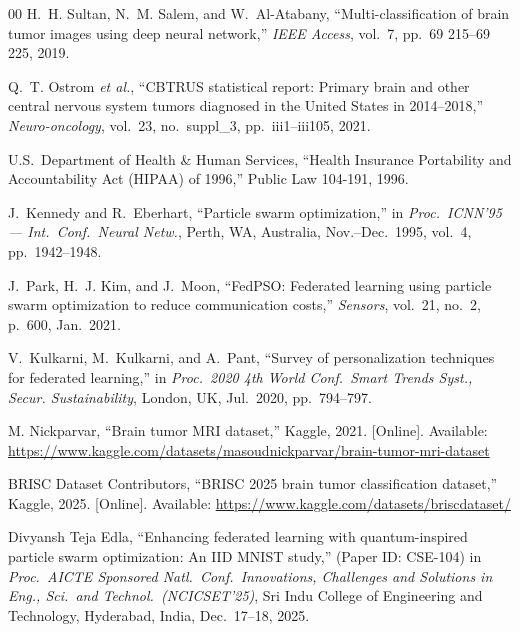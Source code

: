 \documentclass[conference]{IEEEtran}
\begin{document}
\begin{thebibliography}{00}
H.~H. Sultan, N.~M. Salem, and W.~Al-Atabany,
``Multi-classification of brain tumor images using deep neural network,''
\textit{IEEE Access}, vol.~7, pp.~69 215--69 225, 2019.

Q.~T. Ostrom \textit{et al.},
``CBTRUS statistical report: Primary brain and other central nervous system
tumors diagnosed in the United States in 2014--2018,''
\textit{Neuro-oncology}, vol.~23, no.~suppl\_3, pp.~iii1--iii105, 2021.

U.S.\ Department of Health \& Human Services,
``Health Insurance Portability and Accountability Act (HIPAA) of 1996,''
Public Law 104-191, 1996.

J.~Kennedy and R.~Eberhart,
``Particle swarm optimization,''
in \textit{Proc.\ ICNN'95 --- Int.\ Conf.\ Neural Netw.}, Perth, WA, Australia,
Nov.--Dec.\ 1995, vol.~4, pp.~1942--1948.

J.~Park, H.~J. Kim, and J.~Moon,
``FedPSO: Federated learning using particle swarm optimization to
reduce communication costs,''
\textit{Sensors}, vol.~21, no.~2, p.~600, Jan.\ 2021.

V.~Kulkarni, M.~Kulkarni, and A.~Pant,
``Survey of personalization techniques for federated learning,''
in \textit{Proc.\ 2020 4th World Conf.\ Smart Trends Syst., Secur. Sustainability},
London, UK, Jul.\ 2020, pp.~794--797.

M. Nickparvar,
``Brain tumor MRI dataset,''
Kaggle, 2021. [Online]. Available:
\url{https://www.kaggle.com/datasets/masoudnickparvar/brain-tumor-mri-dataset}

BRISC Dataset Contributors,
``BRISC 2025 brain tumor classification dataset,''
Kaggle, 2025. [Online]. Available:
\url{https://www.kaggle.com/datasets/briscdataset/}

Divyansh Teja Edla,
``Enhancing federated learning with quantum-inspired particle swarm
optimization: An {IID} {MNIST} study,'' (Paper ID: CSE-104)
in \textit{Proc.\ AICTE Sponsored Natl.\ Conf.\ Innovations, Challenges
and Solutions in Eng., Sci.\ and Technol.\ (NCICSET'25)},
Sri Indu College of Engineering and Technology, Hyderabad, India,
Dec.\ 17--18, 2025.

\end{thebibliography}
\end{document}
